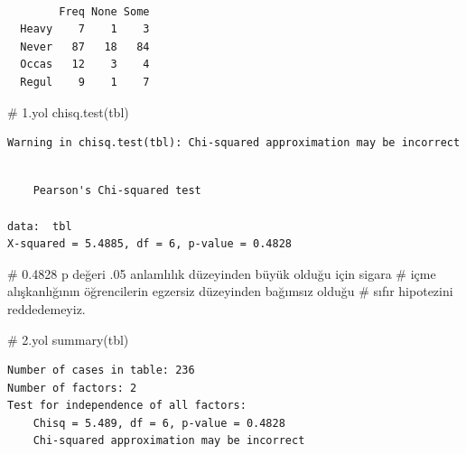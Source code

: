 \documentclass[
  letterpaper,
  DIV=11,
  numbers=noendperiod]{scrreprt}
\newenvironment{Shaded}{\begin{snugshade}}{\end{snugshade}}
\newcommand{\CommentTok}[1]{\textcolor[rgb]{0.37,0.37,0.37}{#1}}
\newcommand{\FunctionTok}[1]{\textcolor[rgb]{0.28,0.35,0.67}{#1}}
\newcommand{\NormalTok}[1]{\textcolor[rgb]{0.00,0.23,0.31}{#1}}
\newcommand{\OtherTok}[1]{\textcolor[rgb]{0.00,0.23,0.31}{#1}}
\newcommand{\SpecialCharTok}[1]{\textcolor[rgb]{0.37,0.37,0.37}{#1}}
\begin{document}
\begin{Shaded}
\end{Shaded}

\begin{verbatim}
       
        Freq None Some
  Heavy    7    1    3
  Never   87   18   84
  Occas   12    3    4
  Regul    9    1    7
\end{verbatim}

\begin{Shaded}
\begin{Highlighting}[]
\CommentTok{\# 1.yol}
\FunctionTok{chisq.test}\NormalTok{(tbl) }
\end{Highlighting}
\end{Shaded}

\begin{verbatim}
Warning in chisq.test(tbl): Chi-squared approximation may be incorrect
\end{verbatim}

\begin{verbatim}

    Pearson's Chi-squared test

data:  tbl
X-squared = 5.4885, df = 6, p-value = 0.4828
\end{verbatim}

\begin{Shaded}
\begin{Highlighting}[]
\CommentTok{\# 0.4828 p değeri .05 anlamlılık düzeyinden büyük olduğu için sigara }
\CommentTok{\# içme alışkanlığının öğrencilerin egzersiz düzeyinden bağımsız olduğu }
\CommentTok{\# sıfır hipotezini reddedemeyiz.}

\CommentTok{\# 2.yol}
\FunctionTok{summary}\NormalTok{(tbl)}
\end{Highlighting}
\end{Shaded}

\begin{verbatim}
Number of cases in table: 236 
Number of factors: 2 
Test for independence of all factors:
    Chisq = 5.489, df = 6, p-value = 0.4828
    Chi-squared approximation may be incorrect
\end{verbatim}

\end{document}
